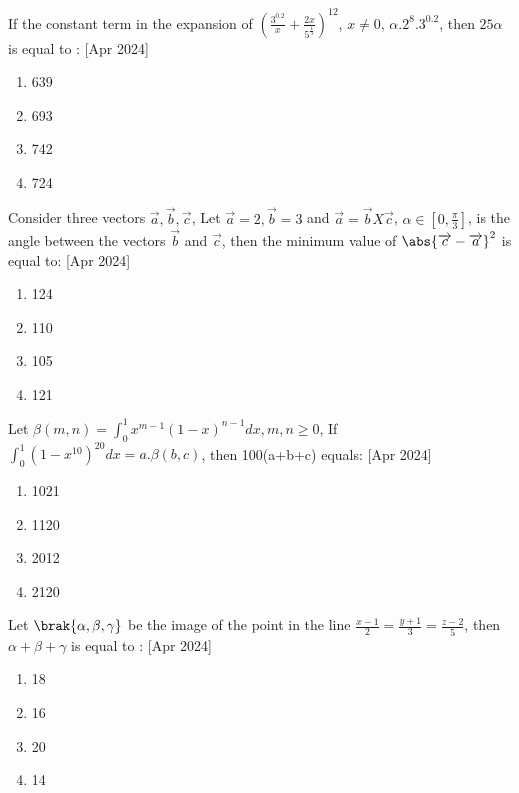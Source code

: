     \item If the constant term in the expansion of $(\frac{3^{0.2}}{x}+\frac{2x}{5^\frac{1}{3}})^{12}$, $x \neq 0$, $\alpha .2^{8}.3^{0.2}$, then $25\alpha$ is  equal to :
      \hfill{[Apr 2024]}
		\begin{multicols}{4}
			\begin{enumerate}
				\item 639
    \item 693
    \item 742
    \item 724
			\end{enumerate}
		\end{multicols}

    \item Consider three vectors $\overrightarrow{a},\overrightarrow{b},\overrightarrow{c}$, Let $\overrightarrow{a}=2,\overrightarrow{b}=3$ and $\overrightarrow{a}=\overrightarrow{b}X\overrightarrow{c}$, $\alpha \in [0,\frac{\pi}{3}]$, is the angle between the vectors $\overrightarrow{b}$ and $\overrightarrow{c}$, then the minimum value of $\abs{\overrightarrow{c}-\overrightarrow{a}}^2$ is equal to:
     \hfill{[Apr 2024]}
		\begin{multicols}{4}
			\begin{enumerate}

				\item 124
    \item 110
     \item 105
      \item 121
			\end{enumerate}
		\end{multicols}

    \item Let $\beta(m,n)=\int_{0}^{1} x^{m-1} (1-x)^{n-1}dx, m,n\geq0$, If $\int_{0}^{1} (1-x^10)^20 dx=a.\beta(b,c)$, then 100(a+b+c) equals:
      \hfill{[Apr 2024]}
    \begin{multicols}{4}
            \begin{enumerate}
              \item 1021
              \item 1120
              \item 2012
              \item 2120
            \end{enumerate}
        \end{multicols}
    \item Let $\brak{\alpha,\beta,\gamma}$ be the image of the point  in the line $\frac{x-1}{2}=\frac{y+1}{3}=\frac{z-2}{5}$, then $\alpha+\beta+\gamma$ is equal to : 
     \hfill{[Apr 2024]}
    \begin{multicols}{4}
            \begin{enumerate}
              \item 18
              \item  16
              \item  20
              \item 14 
              \end{enumerate}
        \end{multicols}

